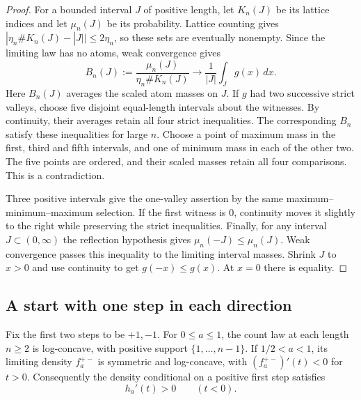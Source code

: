 \begin{proof}
For a bounded interval $J$ of positive length, let $K_n(J)$ be its lattice
indices and let $\mu_n(J)$ be its probability. Lattice counting gives
$|\eta_n\#K_n(J)-|J||\le2\eta_n$, so these sets are eventually nonempty.
Since the limiting law has no atoms, weak convergence gives
\[
 B_n(J):=\frac{\mu_n(J)}{\eta_n\#K_n(J)}
 \longrightarrow \frac1{|J|}\int_J g(x)\,dx.
\]
Here $B_n(J)$ averages the scaled atom masses on $J$.
If $g$ had two successive strict valleys, choose five disjoint
equal-length intervals about the witnesses. By continuity, their
averages retain all four strict inequalities. The corresponding
$B_n$ satisfy these inequalities for large $n$.
Choose a point of maximum mass in the first, third and fifth intervals,
and one of minimum mass in each of the other two. The five points are ordered, and their scaled masses
retain all four comparisons. This is a contradiction.

Three positive intervals give the one-valley assertion by the same
maximum--minimum--maximum selection. If the first witness is $0$,
continuity moves it slightly to the right while preserving the strict
inequalities. Finally, for any interval $J\subset(0,\infty)$ the
reflection hypothesis gives $\mu_n(-J)\le\mu_n(J)$. Weak convergence
passes this inequality to the limiting interval masses. Shrink $J$ to $x>0$ and use continuity to get $g(-x)\le g(x)$.
At $x=0$ there is equality.
\end{proof}

\subsection{A start with one step in each direction}

\begin{lemma}\label{lem:balanced-start}
Fix the first two steps to be $+1,-1$. For $0\le a\le1$, the count
law at each length $n\ge2$ is log-concave, with positive support
$\{1,\ldots,n-1\}$. If $1/2<a<1$, its limiting density
$f_a^{+-}$ is symmetric and log-concave, with
$(f_a^{+-})'(t)<0$ for $t>0$.
Consequently the density conditional on a positive first step satisfies
\[
 h_a'(t)>0\qquad(t<0).
\]
\end{lemma}

